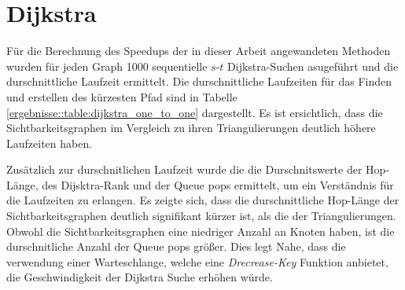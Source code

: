 
%
%
%

\section{Dijkstra}

Für die Berechnung des Speedups der in dieser Arbeit angewandeten Methoden wurden für jeden Graph \num{1000} sequentielle $s$-$t$ Dijkstra-Suchen asugeführt und die durschnittliche Laufzeit ermittelt.
Die durschnittliche Laufzeiten für das Finden und erstellen des kürzesten Pfad sind in Tabelle \ref{ergebnisse::table:dijkstra_one_to_one} dargestellt.
Es ist ersichtlich, dass die Sichtbarkeitsgraphen im Vergleich zu ihren Triangulierungen deutlich höhere Laufzeiten haben.

Zusätzlich zur durschnitlichen Laufzeit wurde die die Durschnitswerte der Hop-Länge, des Dijsktra-Rank und der Queue pops ermittelt, um ein Verständnis für die Laufzeiten zu erlangen.
Es zeigte sich, dass die durschnittliche Hop-Länge der Sichtbarkeitsgraphen deutlich signifikant kürzer ist, als die der Triangulierungen.
Obwohl die Sichtbarkeitsgraphen eine niedriger Anzahl an Knoten haben, ist die durschnitliche Anzahl der Queue pops größer.
Dies legt Nahe, dass die verwendung einer Warteschlange, welche eine \emph{Drecrease-Key} Funktion anbietet, die Geschwindigkeit der Dijkstra Suche erhöhen würde.


